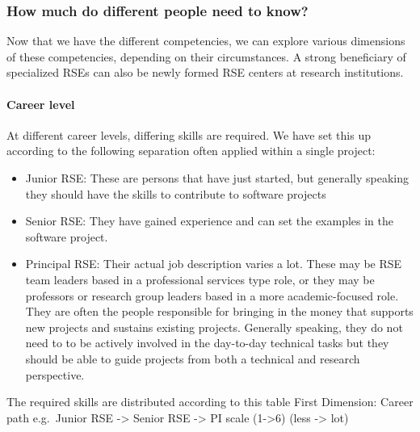 \documentclass[a4paper
]{article}
\providecommand{\tightlist}{%
  \setlength{\itemsep}{0pt}\setlength{\parskip}{0pt}}
\begin{document}
\hypertarget{how-much-do-different-people-need-to-know}{%
\subsubsection{How much do different people need to
know?}\label{how-much-do-different-people-need-to-know}}

Now that we have the different competencies, we can explore various
dimensions of these competencies, depending on their circumstances. A
strong beneficiary of specialized RSEs can also be newly formed RSE
centers at research institutions.

\hypertarget{career-level}{%
\paragraph{Career level}\label{career-level}}

At different career levels, differing skills are required. We have set
this up according to the following separation often applied within a
single project:

\begin{itemize}
\tightlist
\item
  Junior RSE: These are persons that have just started, but generally
  speaking they should have the skills to contribute to software
  projects
\item
  Senior RSE: They have gained experience and can set the examples in
  the software project.
\item
  Principal RSE: Their actual job description varies a lot. These may be
  RSE team leaders based in a professional services type role, or they
  may be professors or research group leaders based in a more
  academic-focused role. They are often the people responsible for
  bringing in the money that supports new projects and sustains existing
  projects. Generally speaking, they do not need to to be actively
  involved in the day-to-day technical tasks but they should be able to
  guide projects from both a technical and research perspective.
\end{itemize}

The required skills are distributed according to this table First
Dimension: Career path e.g.~Junior RSE -\textgreater{} Senior RSE
-\textgreater{} PI scale (1-\textgreater6) (less -\textgreater{} lot)
\end{document}
